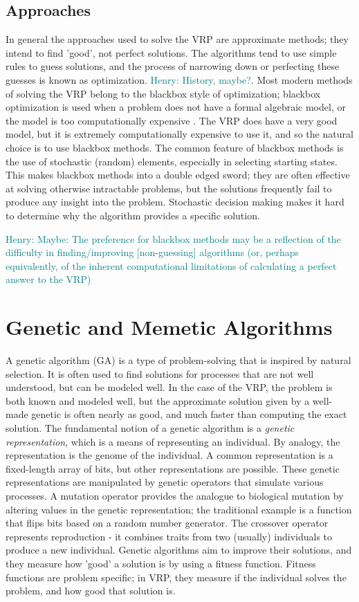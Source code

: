 \documentclass{sig-alternate}
\newcommand{\allcomments}[1]{{#1}}
\newcommand{\hfcomment}[1]{\textcolor{Teal}{\allcomments{Henry: {#1}}}}
\begin{document}
{\subsection{Approaches}
In general the approaches used to solve the VRP are approximate methods; they intend to find 'good', not perfect solutions. The algorithms tend to use simple rules to guess solutions, and the process of narrowing down or perfecting these guesses is known as optimization. \hfcomment{History, maybe?}. Most modern methods of solving the VRP belong to the blackbox style of optimization; blackbox optimization is used when a problem does not have a formal algebraic model, or the model is too computationally expensive \cite{Amaran:2014}. The VRP does have a very good model, but it is extremely computationally expensive to use it, and so the natural choice is to use blackbox methods. The common feature of blackbox methods is the use of stochastic (random) elements, especially in selecting starting states. This makes blackbox methods into a double edged sword; they are often effective at solving otherwise intractable problems, but the solutions frequently fail to produce any insight into the problem. Stochastic decision making makes it hard to determine why the algorithm provides a specific solution. 

\hfcomment{Maybe: The preference for blackbox methods may be a reflection of the difficulty in finding/improving [non-guessing] algorithms (or, perhaps equivalently, of the inherent computational limitations of calculating a perfect answer to the VRP)}

\section{Genetic and Memetic Algorithms}
A genetic algorithm (GA) is a type of problem-solving that is inspired by natural selection. It is often used to find solutions for processes that are not well understood, but can be modeled well. In the case of the VRP, the problem is both known and modeled well, but the approximate solution given by a well-made genetic is often nearly as good, and much faster than computing the exact solution. 
The fundamental notion of a genetic algorithm is a \textit{genetic representation}, which is a means of representing an individual. By analogy, the representation is the genome of the individual.  A common representation is a fixed-length array of bits, but other representations are possible. These genetic representations are manipulated by genetic operators that simulate various processes. A mutation operator provides the analogue to biological mutation by altering values in the genetic representation; the traditional example is a function that flips bits based on a random number generator. The crossover operator represents reproduction - it combines traits from two (usually) individuals to produce a new individual. 
Genetic algorithms aim to improve their solutions, and they measure how 'good' a solution is by using a fitness function. Fitness functions are problem specific; in VRP, they measure if the individual solves the problem, and how good that solution is.

}
\end{document}
